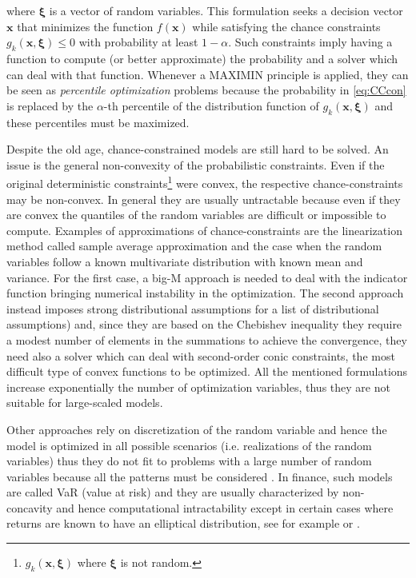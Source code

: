 \noindent where $\boldsymbol{\xi}$ is a vector of random variables. This formulation seeks a decision vector $\mathbf{x}$  that minimizes the function $f(\mathbf{x})$ while satisfying the chance constraints $g_k(\mathbf{x},\boldsymbol{\xi})\leq 0$ with probability at least $1-\alpha$. Such constraints imply having a function to compute (or better approximate) the probability and a solver which can deal with that function. Whenever a MAXIMIN principle is applied, they can be seen as \emph{percentile optimization} problems \parencite{krokhmal2002portfolio} because the probability in \eqref{eq:CCcon} is replaced by the $\alpha$-th percentile of the distribution function of $g_k(\mathbf{x},\boldsymbol{\xi})$ and these percentiles must be maximized.

Despite the old age, chance-constrained models are still hard to be solved. An issue is the general non-convexity of the probabilistic constraints. Even if the original deterministic constraints\footnote{$g_k(\mathbf{x},\boldsymbol{\xi})$ where $\boldsymbol{\xi}$ is not random.} were convex, the respective chance-constraints may be non-convex. In general they are usually untractable \parencite[see][]{Nemirovski} because even if they are convex the quantiles of the random variables are difficult or impossible to compute. Examples of approximations of chance-constraints are the linearization method called sample average approximation \parencite{Ahmed2008} and the case when the random variables follow a known multivariate distribution with known mean and variance. For the first case, a big-M approach is needed to deal with the indicator function bringing numerical instability in the optimization. The second approach instead imposes strong distributional assumptions \parencite[see][]{Kataria} for a list of distributional assumptions) and, since they are based on the Chebishev inequality they require a modest number of elements in the summations to achieve the convergence, they need also a solver which can deal with second-order conic constraints, the most difficult type of convex functions to be optimized. All the mentioned formulations increase exponentially the number of optimization variables, thus they are not suitable for large-scaled models.

Other approaches rely on discretization of the random variable and hence the model is optimized in all possible scenarios (i.e. realizations of the random variables) thus they do not fit to problems with a large number of random variables because all the patterns must be considered \parencite{margellos2014road,wang2011chance,tarim2006}. In finance, such models are called VaR (value at risk) and they are usually characterized by non-concavity and hence computational intractability except in certain cases where returns are known to have an elliptical distribution, see for example \textcite{vehvi2003} or \textcite{mcneil2005}. 

